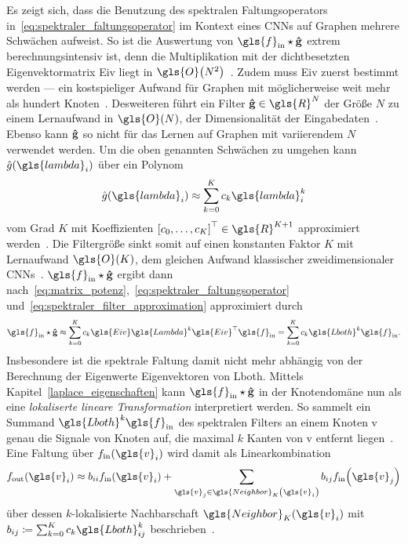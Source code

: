 Es zeigt sich, dass die Benutzung des spektralen Faltungsoperators in~\eqref{eq:spektraler_faltungsoperator} im Kontext eines \glspl{CNN} auf Graphen mehrere Schwächen aufweist.
So ist \zB{} die Auswertung von $\gls{f}_{\mathrm{in}} \star \ve{\hat g}$ extrem berechnungsintensiv ist, denn die Multiplikation mit der dichtbesetzten Eigenvektormatrix \gls{Eiv} liegt in $\gls{O}\left(N^2\right)$~\cite{Defferrard}.
Zudem muss \gls{Eiv} zuerst bestimmt werden — ein kostspieliger Aufwand für Graphen mit möglicherweise weit mehr als hundert Knoten~\cite{gcn}.
Desweiteren führt ein Filter $\ve{\hat g} \in \gls{R}^N$ der Größe $N$ zu einem Lernaufwand in $\gls{O}\left(N\right)$, \dhe{} der Dimensionalität der Eingabedaten~\cite{Defferrard}.
Ebenso kann $\mathbf{\hat g}$ so nicht für das Lernen auf Graphen mit variierendem $N$ verwendet werden.
Um die oben genannten Schwächen zu umgehen kann $\hat g\left(\gls{lambda}_i\right)$ über ein Polynom\begin{equation}
  \hat g\left(\gls{lambda}_i\right) \approx \sum_{k=0}^K c_k\gls{lambda}_i^k
  \label{eq:spektraler_filter_approximation}
\end{equation}
vom Grad $K$ mit Koeffizienten ${\left[c_0, \ldots, c_K\right]}^{\top} \in \gls{R}^{K+1}$ approximiert werden~\cite{Hammond, Defferrard}.
Die Filtergröße sinkt somit auf einen konstanten Faktor $K$ mit Lernaufwand $\gls{O}\left(K\right)$, dem gleichen Aufwand klassischer zweidimensionaler \glspl{CNN}~\cite{Defferrard}.
$\gls{f}_{\mathrm{in}} \star \ve{\hat g}$ ergibt dann nach~\eqref{eq:matrix_potenz},~\eqref{eq:spektraler_faltungsoperator} und~\eqref{eq:spektraler_filter_approximation} approximiert durch~\cite{Defferrard}
\begin{equation}
  \gls{f}_{\mathrm{in}} \star \ve{\hat g} \approx \sum_{k=0}^K c_k\gls{Eiv}\gls{Lambda}^k\gls{Eiv}^{\top}\gls{f}_{\mathrm{in}} = \sum_{k=0}^K c_k \gls{Lboth}^k \gls{f}_{\mathrm{in}}.
  \label{eq:spektraler_faltungsoperator_approximation}
\end{equation}
Insbesondere ist die spektrale Faltung damit nicht mehr abhängig von der Berechnung der Eigenwerte \bzw{} Eigenvektoren von \gls{Lboth}.
Mittels Kapitel~\ref{laplace_eigenschaften} kann $\gls{f}_{\mathrm{in}} \star \ve{\hat g}$ in der Knotendomäne nun als eine \emph{lokaliserte lineare Transformation} interpretiert werden.
So sammelt ein Summand $\gls{Lboth}^k\gls{f}_{\mathrm{in}}$ des spektralen Filters an einem Knoten \gls{v} genau die Signale von Knoten auf, die maximal $k$ Kanten von \gls{v} entfernt liegen~\cite{Hammond}.
Eine Faltung über $f_{\mathrm{in}}\left(\gls{v}_i\right)$ wird damit als Linearkombination
\begin{equation*}
  f_{\mathrm{out}}\left(\gls{v}_i\right) \approx b_{ii} f_{\mathrm{in}}\left(\gls{v}_i\right) + \sum_{\gls{v}_j \in \gls{Neighbor}_K\left(\gls{v}_i\right)} b_{ij} f_{\mathrm{in}}\left(\gls{v}_j\right)
\end{equation*}
über dessen $k$-lokalisierte Nachbarschaft $\gls{Neighbor}_K\left(\gls{v}_i\right)$ mit $b_{ij} \coloneqq \sum_{k=0}^K c_k \gls{Lboth}^k_{ij}$ beschrieben~\cite{Shuman}.

